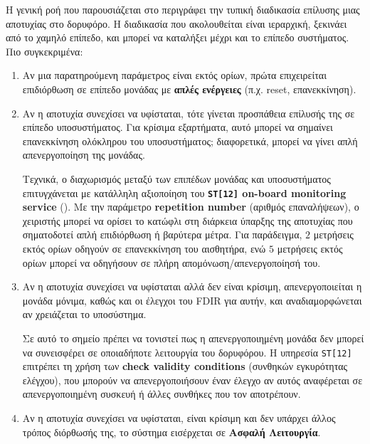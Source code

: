 \documentclass[a4paper,nobib]{tufte-book}
\begin{document}
Η γενική ροή που παρουσιάζεται στο  περιγράφει την τυπική διαδικασία επίλυσης μιας αποτυχίας στο δορυφόρο. Η διαδικασία που ακολουθείται είναι ιεραρχική, ξεκινάει από το χαμηλό επίπεδο, και μπορεί να καταλήξει μέχρι και το επίπεδο συστήματος. Πιο συγκεκριμένα:
\begin{enumerate}
	\item Αν μια παρατηρούμενη παράμετρος είναι εκτός ορίων, πρώτα επιχειρείται επιδιόρθωση σε επίπεδο μονάδας με \textbf{απλές ενέργειες} (π.χ. reset, επανεκκίνηση).
	\item Αν η αποτυχία συνεχίσει να υφίσταται, τότε γίνεται προσπάθεια επίλυσής της σε επίπεδο υποσυστήματος. Για κρίσιμα εξαρτήματα, αυτό μπορεί να σημαίνει επανεκκίνηση ολόκληρου του υποσυστήματος; διαφορετικά, μπορεί να γίνει απλή απενεργοποίηση της μονάδας.
	
	Τεχνικά, ο διαχωρισμός μεταξύ των επιπέδων μονάδας και υποσυστήματος επιτυγχάνεται με κατάλληλη αξιοποίηση του \textbf{\texttt{ST[12]} on-board monitoring service} (). Με την παράμετρο \textbf{repetition number} (αριθμός επαναλήψεων), ο χειριστής μπορεί να ορίσει το κατώφλι στη διάρκεια ύπαρξης της αποτυχίας που σηματοδοτεί απλή επιδιόρθωση ή βαρύτερα μέτρα. Για παράδειγμα, \( 2 \) μετρήσεις εκτός ορίων οδηγούν σε επανεκκίνηση του αισθητήρα, ενώ \( 5 \) μετρήσεις εκτός ορίων μπορεί να οδηγήσουν σε πλήρη απομόνωση/απενεργοποίησή του.
	\item Αν η αποτυχία συνεχίσει να υφίσταται αλλά δεν είναι κρίσιμη, απενεργοποιείται η μονάδα μόνιμα, καθώς και οι έλεγχοι του \acs{FDIR} για αυτήν, και αναδιαμορφώνεται αν χρειάζεται το υποσύστημα.
	
	Σε αυτό το σημείο πρέπει να τονιστεί πως η απενεργοποιημένη μονάδα δεν μπορεί να συνεισφέρει σε οποιαδήποτε λειτουργία του δορυφόρου. Η υπηρεσία \texttt{ST[12]} επιτρέπει τη χρήση των \textbf{check validity conditions} (συνθηκών εγκυρότητας ελέγχου), που μπορούν να απενεργοποιήσουν έναν έλεγχο αν αυτός αναφέρεται σε απενεργοποιημένη συσκευή ή άλλες συνθήκες που τον αποτρέπουν.
	\item Αν η αποτυχία συνεχίσει να υφίσταται, είναι κρίσιμη και δεν υπάρχει άλλος τρόπος διόρθωσής της, το σύστημα εισέρχεται σε \textbf{Ασφαλή Λειτουργία}.
\end{enumerate}
\end{document}
